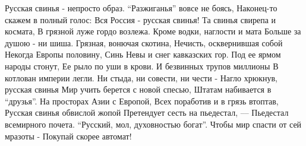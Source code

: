  
 
 
 
 

\obeycr
Русская свинья - непросто образ.
\enquote{Разжиганья} вовсе не боясь,
Наконец-то скажем в полный голос:
Вся Россия - русская свинья!
Та свинья свирепа и космата,
В грязной луже гордо возлежа.
Кроме водки, наглости и мата
Больше за душою - ни шиша.
Грязная, вонючая скотина,
Нечисть, осквернившая собой
Некогда Европы половину,
Синь Невы и снег кавказских гор.
Под ее ярмом народы стонут,
Ее рыло по уши в крови.
И безвинных трупов миллионы
В котлован империи легли.
Ни стыда, ни совести, ни чести -
Нагло хрюкнув, русская свинья
Мир учить берется с новой спесью,
Штатам набивается в \enquote{друзья}.
На просторах Азии с Европой,
Всех поработив и в грязь втоптав,
Русская свинья обвислой жопой
Претендует сесть на пьедестал, ––
Пьедестал всемирного почета.
\enquote{Русский, мол, духовностью богат}.
Чтобы мир спасти от сей мразоты -
Покупай скорее автомат!
\restorecr

